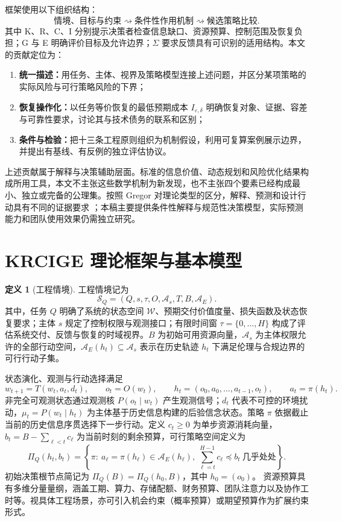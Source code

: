 \documentclass[11pt,a4paper]{ctexart}
\numberwithin{equation}{section}
\theoremstyle{definition}
\newtheorem{definition}{定义}[section]
\theoremstyle{plain}
\begin{document}
框架使用以下组织结构：
\[
\text{情境、目标与约束}
\rightsquigarrow
\text{条件性作用机制}
\rightsquigarrow
\text{候选策略比较}.
\]
其中 K、R、C、I 分别提示决策者检查信息缺口、资源预算、控制范围及恢复负担；G 与 E 明确评价目标及允许边界；$\Sigma$ 要求反馈具有可识别的适用结构。本文的贡献定位为：
\begin{enumerate}[label=(\arabic*)]
    \item \textbf{统一描述：}用任务、主体、视界及策略模型连接上述问题，并区分某项策略的实际风险与可行策略风险的下界；
    \item \textbf{恢复操作化：}以任务等价恢复的最低预期成本 $I_{\varepsilon,\delta}$ 明确恢复对象、证据、容差与可靠性要求，讨论其与技术债务的联系和区别；
    \item \textbf{条件与检验：}把十三条工程原则组织为机制假设，利用可复算案例展示边界，并提出有基线、有反例的独立评估协议。
\end{enumerate}

上述贡献属于解释与决策辅助层面。标准的信息价值、动态规划和风险优化结果构成所用工具，本文不主张这些数学机制为新发现，也不主张四个要素已经构成最小、独立或完备的公理集。按照 Gregor 对理论类型的区分，解释、预测和设计行动具有不同的证据要求 \cite{gregor2006}；本稿主要提供条件性解释与规范性决策模型，实际预测能力和团队使用效果仍需独立研究。

\section{KRCIGE 理论框架与基本模型}
\label{sec:model}

\begin{definition}[工程情境]
工程情境记为
\[
\mathcal{S}_Q=(Q,s,\tau,O,\mathcal{A}_s,T,B,\mathcal{A}_E).
\]
其中，任务 $Q$ 明确了系统的状态空间 $\mathcal{W}$、预期交付价值度量、损失函数及状态恢复要求；主体 $s$ 规定了控制权限与观测接口；有限时间窗 $\tau=\{0,\ldots,H\}$ 构成了评估系统交付、反馈与恢复的时域视界。$B$ 为初始可用资源向量，$\mathcal{A}_s$ 为主体权限允许的全部行动空间，$\mathcal{A}_E(h_t)\subseteq\mathcal{A}_s$ 表示在历史轨迹 $h_t$ 下满足伦理与合规边界的可行行动子集。
\end{definition}

状态演化、观测与行动选择满足
\begin{equation}
w_{t+1}=T(w_t,a_t,d_t),\qquad o_t=O(w_t),\qquad
h_t=(o_0,a_0,\ldots,a_{t-1},o_t),\qquad a_t=\pi(h_t).
\label{eq:dynamics}
\end{equation}
非完全可观测状态通过观测核 $P(o_t\mid w_t)$ 产生观测信号；$d_t$ 代表不可控的环境扰动，$\mu_t=P(w_t\mid h_t)$ 为主体基于历史信息构建的后验信念状态。策略 $\pi$ 依据截止当前的历史信息序贯选择下一步行动。定义 $c_t\ge0$ 为单步资源消耗向量，$b_t=B-\sum_{\ell<t}c_\ell$ 为当前时刻的剩余预算，可行策略空间定义为
\begin{equation}
\Pi_Q(h_t,b_t)=\left\{\pi:\ a_\ell=\pi(h_\ell)\in\mathcal{A}_E(h_\ell),\
\textstyle\sum_{\ell=t}^{H-1}c_\ell\preceq b_t\ \text{几乎处处}\right\}.
\label{eq:feasible-policy}
\end{equation}
初始决策根节点简记为 $\Pi_Q(B)=\Pi_Q(h_0,B)$，其中 $h_0=(o_0)$。
资源预算具有多维分量量纲，涵盖工期、算力、存储配额、财务预算、团队注意力以及协作工时等。视具体工程场景，亦可引入机会约束（概率预算）或期望预算作为扩展约束形式。
\end{document}
